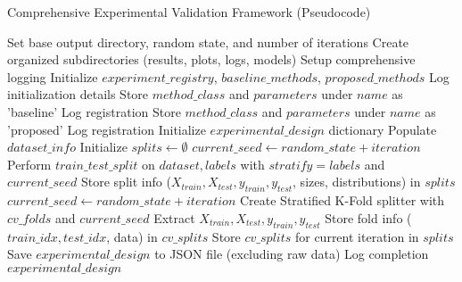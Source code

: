 \begin{algorithm}[!htbp]
\caption{Comprehensive Experimental Validation Framework (Pseudocode)}
\label{alg:experimental-validation-implementation}
\begin{algorithmic}[1]
    \State Set base output directory, random state, and number of iterations
    \State Create organized subdirectories (results, plots, logs, models)
    \State Setup comprehensive logging
    \State Initialize $experiment\_registry$, $baseline\_methods$, $proposed\_methods$
    \State Log initialization details
\EndProcedure
\Statex
{}
    \State Store $method\_class$ and $parameters$ under $name$ as 'baseline'
    \State Log registration
\EndProcedure
\Statex
{}
    \State Store $method\_class$ and $parameters$ under $name$ as 'proposed'
    \State Log registration
\EndProcedure
\Statex
{}
    \State Initialize $experimental\_design$ dictionary
    \State Populate $dataset\_info$
    \State Initialize $splits \leftarrow \emptyset$
            \State $current\_seed \leftarrow random\_state + iteration$
            \State Perform $train\_test\_split$ on $dataset, labels$ with $stratify=labels$ and $current\_seed$
            \State Store split info ($X_{train}, X_{test}, y_{train}, y_{test}$, sizes, distributions) in $splits$
        \EndFor
            \State $current\_seed \leftarrow random\_state + iteration$
            \State Create Stratified K-Fold splitter with $cv\_folds$ and $current\_seed$
                \State Extract $X_{train}, X_{test}, y_{train}, y_{test}$
                \State Store fold info ($train\_idx, test\_idx$, data) in $cv\_splits$
            \EndFor
            \State Store $cv\_splits$ for current iteration in $splits$
        \EndFor
    \EndIf
    \State Save $experimental\_design$ to JSON file (excluding raw data)
    \State Log completion
    \Return $experimental\_design$
\EndProcedure
\Statex
{}

\end{algorithmic}
\end{algorithm}
